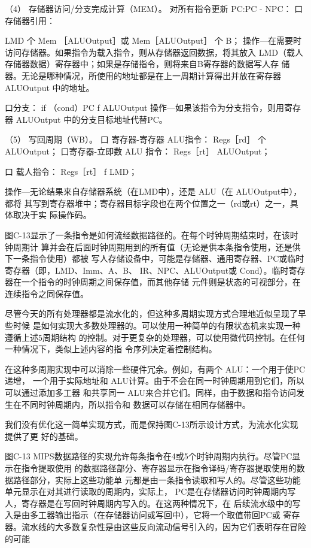 （4） 存储器访问/分支完成计算（MEM）。
对所有指令更新 PC:PC - NPC：
口存储器引用：

LMD 个 Mem ［ALUOutput］或
Mem［ALUOutput］ 个 B；
操作—在需要时访问存储器。如果指令为载入指令，则从存储器返回数据，将其放入
LMD（载人存储器数据）寄存器中；如果是存储指令，则将来自B寄存器的数据写人存
储器。无论是哪种情况，所使用的地址都是在上一周期计算得出并放在寄存器
ALUOutput 中的地址。

口分支：
if （cond）PC f ALUOutput
操作—如果该指令为分支指令，则用寄存器 ALUOutput 中的分支目标地址代替PC。

（5） 写回周期（WB）。
口 寄存器-寄存器 ALU指令：
Regs［rd］ 个 ALUOutput；
口寄存器-立即数 ALU 指令：
Regs［rt］ ALUOutput；

口 载人指令：
Regs［rt］ f LMD；

操作—无论结果来自存储器系统（在LMD中），还是 ALU（在 ALUOutput中），都将
其写到寄存器堆中；寄存器目标字段也在两个位置之一（rd或rt）之一，具体取决于实
际操作码。

图C-13显示了一条指令是如何流经数据路径的。在每个时钟周期结束时，在该时钟周期计
算并会在后面时钟周期用到的所有值（无论是供本条指令使用，还是供下一条指令使用）都被
写人存储设备中，可能是存储器、通用寄存器、PC或临时寄存器（即，LMD、Imm、A、B、
IR、NPC、ALUOutput或 Cond）。临时寄存器在一个指令的时钟周期之间保存值，而其他存储
元件则是状态的可视部分，在连续指令之同保存值。

尽管今天的所有处理器都是流水化的，但这种多周期实现方式合理地近似呈现了早些时候
是如何实现大多数处理器的。可以使用一种简单的有限状态机来实现一种遵循上述5周期结构
的控制。对于更复杂的处理器，可以使用微代码控制。在任何一种情况下，类似上述内容的指
令序列决定着控制结构。

在这种多周期实现中可以消除一些硬件冗余。例如，有两个 ALU：一个用于使PC递增，
一个用于实际地址和 ALU计算。由于不会在同一时钟周期用到它们，所以可以通过添加多工器
和共享同一 ALU来合并它们。同样，由于数据和指令访问发生在不同时钟周期内，所以指令和
数据可以存储在相同存储器中。

我们没有优化这一简单实现方式，而是保持图C-13所示设计方式，为流水化实现提供了更
好的基础。

图C-13 MIPS数据路径的实现允许每条指令在4或5个时钟周期内执行。尽管PC显示在指令提取使用
的数据路径部分、寄存器显示在指令译码/寄存器提取使用的数据路径部分，实际上这些功能单
元都是由一条指令读取和写人的。尽管这些功能单元显示在对其进行读取的周期内，实际上，
PC是在存储器访问时钟周期内写人，寄存器是在写回时钟周期内写入的。在这两种情况下，在
后续流水级中的写入是由多工器输出指示（在存储器访问或写回中），它将一个取值带回PC或
寄存器。流水线的大多数复杂性是由这些反向流动信号引入的，因为它们表明存在冒险的可能

